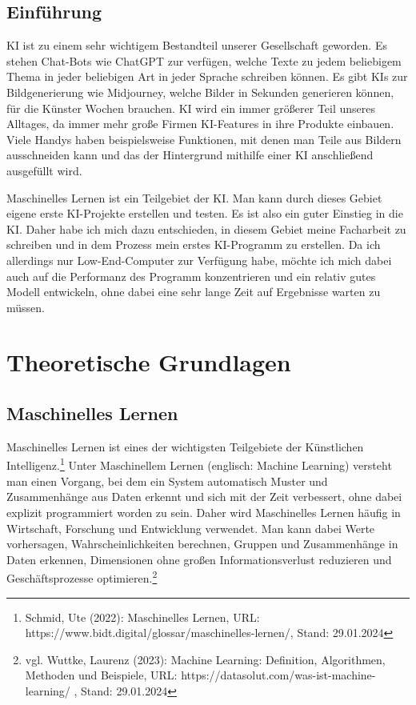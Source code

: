 \documentclass[11pt,oneside]{report}
\begin{document}


\setcounter{page}{2}
\tableofcontents

\listoffigures

\newpage


\section{Einführung}
KI ist zu einem sehr wichtigem Bestandteil unserer Gesellschaft geworden. Es stehen Chat-Bots wie ChatGPT zur verfügen, welche Texte zu jedem beliebigem Thema in jeder beliebigen Art in jeder Sprache schreiben können. Es gibt KIs zur Bildgenerierung wie Midjourney, welche Bilder in Sekunden generieren können, für die Künster Wochen brauchen. KI wird ein immer größerer Teil unseres Alltages, da immer mehr große Firmen KI-Features in ihre Produkte einbauen. Viele Handys haben beispielsweise Funktionen, mit denen man Teile aus Bildern ausschneiden kann und das der Hintergrund mithilfe einer KI anschließend ausgefüllt wird.

Maschinelles Lernen ist ein Teilgebiet der KI. Man kann durch dieses Gebiet eigene erste KI-Projekte erstellen und testen. Es ist also ein guter Einstieg in die KI. Daher habe ich mich dazu entschieden, in diesem Gebiet meine Facharbeit zu schreiben und in dem Prozess mein erstes KI-Programm zu erstellen. Da ich allerdings nur Low-End-Computer zur Verfügung habe, möchte ich mich dabei auch auf die Performanz des Programm konzentrieren und ein relativ gutes Modell entwickeln, ohne dabei eine sehr lange Zeit auf Ergebnisse warten zu müssen.


\chapter{Theoretische Grundlagen}

\section{Maschinelles Lernen}
Maschinelles Lernen ist eines der wichtigsten Teilgebiete der Künstlichen Intelligenz.\footnote{Schmid, Ute (2022): Maschinelles Lernen, URL: https://www.bidt.digital/glossar/maschinelles-lernen/, Stand: 29.01.2024} Unter Maschinellem Lernen (englisch: Machine Learning) versteht man einen Vorgang, bei dem ein System automatisch Muster und Zusammenhänge aus Daten erkennt und sich mit der Zeit verbessert, ohne dabei explizit programmiert worden zu sein. Daher wird Maschinelles Lernen häufig in Wirtschaft, Forschung und Entwicklung verwendet. Man kann dabei Werte vorhersagen, Wahrscheinlichkeiten berechnen, Gruppen und Zusammenhänge in Daten erkennen, Dimensionen ohne großen Informationsverlust reduzieren und Geschäftsprozesse optimieren.\footnote{vgl. Wuttke, Laurenz (2023): Machine Learning: Definition, Algorithmen, Methoden und Beispiele, URL: https://datasolut.com/was-ist-machine-learning/ , Stand: 29.01.2024}
\end{document}
